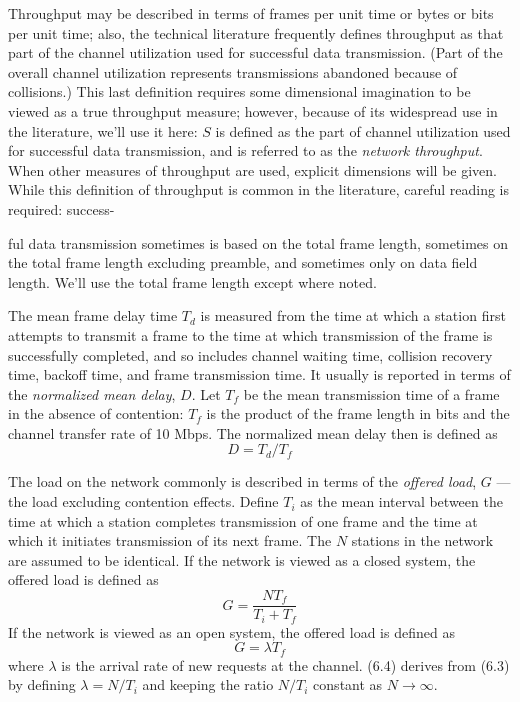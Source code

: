Throughput may be described in terms of frames per unit time or bytes or bits per unit time; also, the technical literature frequently defines throughput as that part of the channel utilization used for successful data transmission. (Part of the overall channel utilization represents transmissions abandoned because of collisions.) This last definition requires some dimensional imagination to be viewed as a true throughput measure; however, because of its widespread use in the literature, we'll use it here: $S$ is defined as the part of channel utilization used for successful data transmission, and is referred to as the \emph{network throughput}. When other measures of throughput are used, explicit dimensions will be given. While this definition of throughput is common in the literature, careful reading is required: success-

\noindent ful data transmission sometimes is based on the total frame length, sometimes on the total frame length excluding preamble, and sometimes only on data field length. We'll use the total frame length except where noted.

The mean frame delay time $T_d$ is measured from the time at which a station first attempts to transmit a frame to the time at which transmission of the frame is successfully completed, and so includes channel waiting time, collision recovery time, backoff time, and frame transmission time. It usually is reported in terms of the \emph{normalized mean delay}, $D$. Let $T_f$ be the mean transmission time of a frame in the absence of contention: $T_f$ is the product of the frame length in bits and the channel transfer rate of 10 Mbps. The normalized mean delay then is defined as
\begin{equation} D=T_d/T_f \end{equation}

The load on the network commonly is described in terms of the \emph{offered load}, $G$ --- the load excluding contention effects. Define $T_i$ as the mean interval between the time at which a station completes transmission of one frame and the time at which it initiates transmission of its next frame. The $N$ stations in the network are assumed to be identical. If the network is viewed as a closed system, the offered load is defined as
\begin{equation} G=\frac{NT_f}{T_i+T_f} \end{equation}
If the network is viewed as an open system, the offered load is defined as
\begin{equation} G=\lambda T_f \end{equation}
where $\lambda$ is the arrival rate of new requests at the channel. (6.4) derives from (6.3) by defining $\lambda=N/T_i$ and keeping the ratio $N/T_i$ constant as $N\to\infty$.


